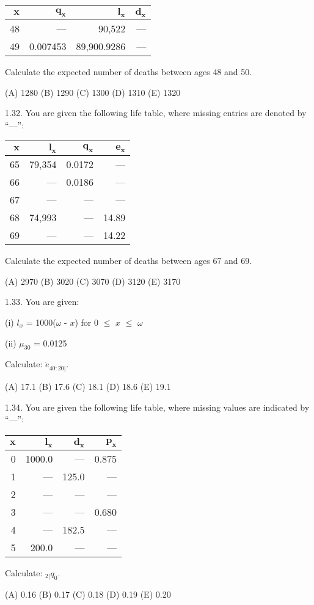 \documentclass[]{book}
\begin{document}
\begin{longtable}[]{@{}rrrr@{}}
\toprule
\(\mathbf{x}\) & \(\mathbf{q_x}\) & \(\mathbf{l_x}\) &
\(\mathbf{d_x}\)\tabularnewline
\midrule
\endhead
48 & --- & 90,522 & ---\tabularnewline
49 & 0.007453 & 89,900.9286 & ---\tabularnewline
\bottomrule
\end{longtable}

Calculate the expected number of deaths between ages 48 and 50.

(A) 1280 (B) 1290 (C) 1300 (D) 1310 (E) 1320

1.32. You are given the following life table, where missing entries are
denoted by ``---'':

\begin{longtable}[]{@{}rrrr@{}}
\toprule
\(\mathbf{x}\) & \(\mathbf{l_{x}}\) & \(\mathbf{q_{x}}\) &
\(\mathbf{e_{x}}\)\tabularnewline
\midrule
\endhead
65 & 79,354 & 0.0172 & ---\tabularnewline
66 & --- & 0.0186 & ---\tabularnewline
67 & --- & --- & ---\tabularnewline
68 & 74,993 & --- & 14.89\tabularnewline
69 & --- & --- & 14.22\tabularnewline
\bottomrule
\end{longtable}

Calculate the expected number of deaths between ages 67 and 69.

(A) 2970 (B) 3020 (C) 3070 (D) 3120 (E) 3170

1.33. You are given:

(i) \(l_x\) = 1000(\(\omega\) - \(x\)) for 0 \(\le\) \(x\) \(\le\)
\(\omega\)

(ii) \(\mu_{30}\) = 0.0125

Calculate: \(\mathring{e}_{40 :\overline{20}|}\).

(A) 17.1 (B) 17.6 (C) 18.1 (D) 18.6 (E) 19.1

1.34. You are given the following life table, where missing values are
indicated by ``---'':

\begin{longtable}[]{@{}rrrr@{}}
\toprule
\(\mathbf{x}\) & \(\mathbf{l_x}\) & \(\mathbf{d_x}\) &
\(\mathbf{p_x}\)\tabularnewline
\midrule
\endhead
0 & 1000.0 & --- & 0.875\tabularnewline
1 & --- & 125.0 & ---\tabularnewline
2 & --- & --- & ---\tabularnewline
3 & --- & --- & 0.680\tabularnewline
4 & --- & 182.5 & ---\tabularnewline
5 & 200.0 & --- & ---\tabularnewline
\bottomrule
\end{longtable}

Calculate: \({}_{2|}q_{0}\).

(A) 0.16 (B) 0.17 (C) 0.18 (D) 0.19 (E) 0.20
\end{document}
